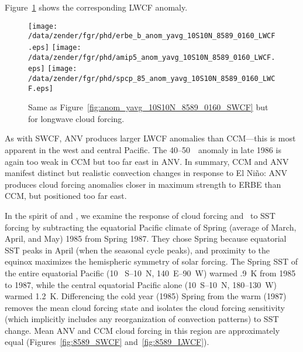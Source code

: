 \documentclass[agums]{aguplus}
\begin{document}
Figure~\ref{fig:anom_yavg_10S10N_8589_0160_LWCF} shows the
corresponding LWCF anomaly.
\begin{figure}
\begin{center}
\ifphdcsz{\setlength{\heightdim}{.9\textheight}}{\setlength{\heightdim}{\textheight}}
\texttt{[image: /data/zender/fgr/phd/erbe\_b\_anom\_yavg\_10S10N\_8589\_0160\_LWCF.eps]}\vfill
\texttt{[image: /data/zender/fgr/phd/amip5\_anom\_yavg\_10S10N\_8589\_0160\_LWCF.eps]}\vfill
\texttt{[image: /data/zender/fgr/phd/spcp\_85\_anom\_yavg\_10S10N\_8589\_0160\_LWCF.eps]}\vfill
\end{center}
\caption{Same as Figure~\ref{fig:anom_yavg_10S10N_8589_0160_SWCF} but
for longwave cloud forcing.
\label{fig:anom_yavg_10S10N_8589_0160_LWCF}}
\end{figure}
As with SWCF, ANV produces larger LWCF anomalies than CCM---this is
most apparent in the west and central Pacific. 
The 40--50~\wxmS\ anomaly in late 1986 is again too weak in CCM but
too far east in ANV. 
In summary, CCM and ANV manifest distinct but realistic convection
changes in response to El Ni\~no: 
ANV produces cloud forcing anomalies closer in maximum strength to
ERBE than CCM, but positioned too far east. 

In the spirit of \cite{RaC91} and \cite{Cho94}, we examine the
response of cloud forcing and \qc\ to SST forcing by subtracting the
equatorial Pacific climate of Spring (average of March, April, and
May) 1985 from Spring 1987. 
They chose Spring because equatorial SST peaks in April (when the
seasonal cycle peaks), and proximity to the equinox maximizes the
hemispheric symmetry of solar forcing. 
The Spring SST of the entire equatorial Pacific (10~\dgr
S--10~\dgr N, 140~\dgr E--90~\dgr W) warmed .9~\dgr K
from 1985 to 1987, while the central equatorial Pacific alone
(10~\dgr S--10~\dgr N, 180--130~\dgr W) warmed
1.2~\dgr K. 
Differencing the cold year (1985) Spring from the warm (1987) removes
the mean cloud forcing state and isolates the cloud forcing
sensitivity (which implicitly includes any reorganization of
convection patterns) to SST change.
Mean ANV and CCM cloud forcing in this region are approximately equal 
(Figures~\ref{fig:8589_SWCF} and~\ref{fig:8589_LWCF}).
\end{document}
